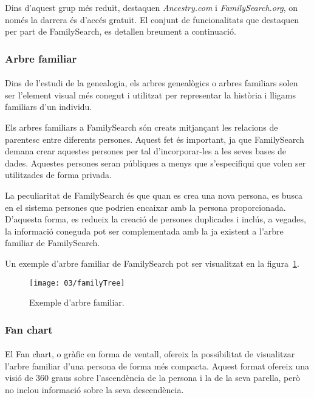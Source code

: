     Dins d’aquest grup més reduït, destaquen \emph{Ancestry.com} i \emph{FamilySearch.org}, on només la darrera és d’accés gratuït. El conjunt de funcionalitats que destaquen per part de FamilySearch, es detallen breument a continuació.


    \subsubsection{Arbre familiar}

    \paragraph{}
    Dins de l’estudi de la genealogia, els arbres genealògics o arbres familiars solen ser l’element visual més conegut i utilitzat per representar la història i lligams familiars d'un individu.

    Els arbres familiars a FamilySearch són creats mitjançant les relacions de pa\-ren\-tesc entre diferents persones. Aquest fet és important, ja que FamilySearch demana crear aquestes persones per tal d'incorporar-les a les seves bases de dades. Aquestes persones seran públiques a menys que s'especifiqui que volen ser utilitzades de forma privada.

    La peculiaritat de FamilySearch és que quan es crea una nova persona, es busca en el sistema persones que podrien encaixar amb la persona proporcionada. D'aquesta forma, es redueix la creació de persones duplicades i inclús, a vegades, la informació coneguda pot ser complementada amb la ja existent a l'arbre familiar de FamilySearch.

    Un exemple d'arbre familiar de FamilySearch  pot ser visualitzat en la figura~\ref{fig:familyTree}.

    \begin{figure}[h]
        \texttt{[image: 03/familyTree]}
        \centering
        \caption{Exemple d'arbre familiar.\label{fig:familyTree}}
    \end{figure}


    \subsubsection{Fan chart}

    \paragraph{}
    El Fan chart, o gràfic en forma de ventall, ofereix la possibilitat de visualitzar l'arbre familiar d'una persona de forma més compacta. Aquest format ofereix una visió de 360 graus sobre l'ascendència de la persona i la de la seva parella, però no inclou informació sobre la seva descendència.

